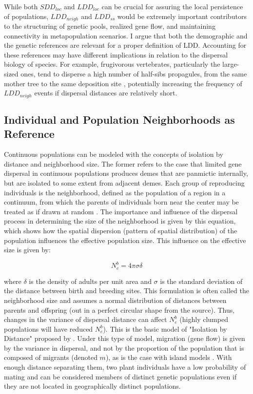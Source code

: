 \documentclass[a4paper, 12pt]{article}
\begin{document}
\begin{linenumbers}
While both $SDD_{loc}$ and $LDD_{loc}$ can be crucial for assuring the local persistence of populations, $LDD_{neigh}$ and $LDD_{ss}$ would be extremely important contributors to the structuring of genetic pools, realized gene flow, and maintaining connectivity in metapopulation scenarios. I argue that both the demographic and the genetic references are relevant for a proper definition of LDD. Accounting for these references may have different implications in relation to the dispersal biology of species. For example, frugivorous vertebrates, particularly the large-sized ones, tend to disperse a high number of half-sibs propagules, from the same mother tree to the same deposition site \citep{Jordano:2007,Karubian:2010br,Scofield:2012gk}, potentially increasing the frequency of $LDD_{neigh}$ events if dispersal distances are relatively short.   


\subsection*{Individual and Population Neighborhoods as Reference}

Continuous populations can be modeled with the concepts of isolation by distance and neighborhood size\citep{Wright:1943aa,Wright:1946aa}. The former refers to the case that limited gene dispersal in continuous populations produces demes that are panmictic internally, but are isolated to some extent from adjacent demes. Each group of reproducing individuals is the neighborhood, defined as the population of a region in a continuum, from which the parents of individuals born near the center may be treated as if drawn at random \citep{Wright:1969mb}. The importance and influence of the dispersal process in determining the size of the neighborhood is given by this equation, which shows how the spatial dispersion (pattern of spatial distribution) of the population influences the effective population size. This influence on the effective size is given by:  

\begin{equation}
					N^b_e= 4 \pi \sigma \delta
\end{equation}

where $\delta$ is the density of adults per unit area and $\sigma$ is the standard deviation of the distance between birth and breeding sites. This formulation is often called the neighborhood size and assumes a normal distribution of distances between parents and offspring (out in a perfect circular shape from the source). Thus, changes in the variance of dispersal distance can affect $N^b_e$ (highly clumped populations will have reduced $N^b_e$). This is the basic model of "Isolation by Distance" proposed by   \citet{Wright:1943aa,Wright:1946aa}. Under this type of model, migration (gene flow) is given by the variance in dispersal, and not by the proportion of the population that is composed of migrants (denoted $m$), as is the case with island models \citep{Slatkin:1985qb}. With enough distance separating them, two plant individuals have a low probability of mating and can be considered members of distinct genetic populations even if they are not located in geographically distinct populations.


\end{linenumbers}
\end{document}
